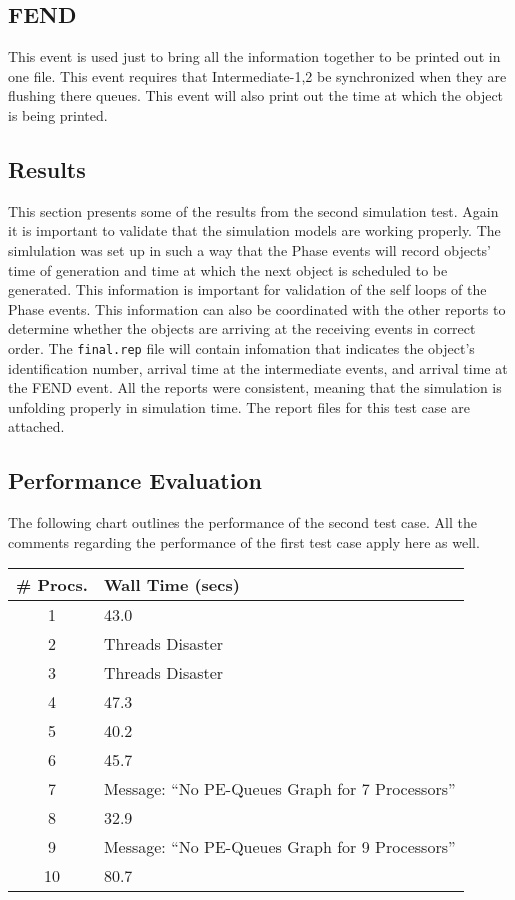 \subsection{FEND}
This event is used just to bring all the information together to be
printed out in one file.  This event requires that Intermediate-1,2
be synchronized when they are flushing there queues.  This event will
also print out the time at which the object is being printed.
 
\subsection{Results}
This section presents some of the results from the second simulation
test.  Again it is important to validate that the simulation models are
working properly.  The simlulation was set up in such a way that
the Phase events will record objects'  time of
generation and time at which the next object is scheduled to be
generated.  This information is important for validation of the self
loops of the Phase events.  This information can also be coordinated
with the other reports to determine whether the objects are arriving at
the receiving events in correct order.  The {\tt final.rep} file will
contain infomation that indicates the object's identification number,
arrival time at the intermediate events, and arrival time at the
FEND event. All the reports were consistent, meaning that the simulation
is unfolding properly in simulation time. The report files for this test
case are attached.
 
\subsection {Performance Evaluation}

The following chart outlines the performance of the second test case.
All the comments regarding the performance of the first test case apply
here as well.

\begin{tabular}{||c|l||} \hline
  \# Procs.  &   Wall Time (secs) \\ \hline
	1   &	43.0  \\
	2   &	Threads Disaster  \\
	3   &	Threads Disaster  \\
	4   &	47.3  \\
	5   &	40.2  \\
	6   &	45.7  \\
	7   &	Message: ``No PE-Queues Graph for 7 Processors''  \\
	8   &	32.9  \\
	9   &	Message: ``No PE-Queues Graph for 9 Processors'' \\
	10  &	80.7 \\ \hline
\end{tabular}

